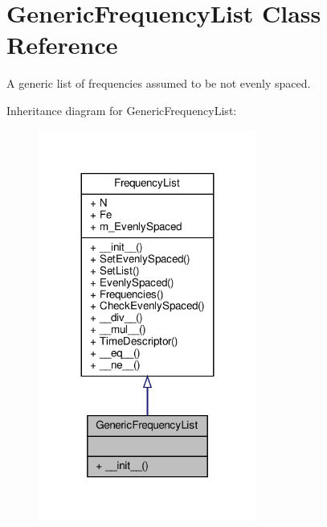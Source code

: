 \hypertarget{classSignalIntegrity_1_1FrequencyDomain_1_1FrequencyList_1_1GenericFrequencyList}{}\section{Generic\+Frequency\+List Class Reference}
\label{classSignalIntegrity_1_1FrequencyDomain_1_1FrequencyList_1_1GenericFrequencyList}


A generic list of frequencies assumed to be not evenly spaced.  




Inheritance diagram for Generic\+Frequency\+List\+:
\nopagebreak
\begin{figure}[H]
\begin{center}
\leavevmode
\includegraphics[width=203pt]{classSignalIntegrity_1_1FrequencyDomain_1_1FrequencyList_1_1GenericFrequencyList__inherit__graph}
\end{center}
\end{figure}


